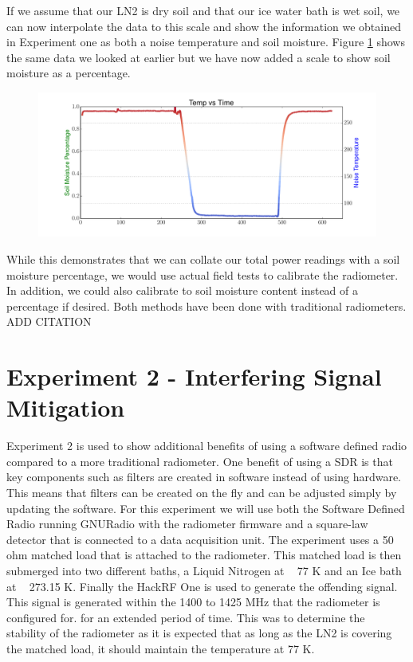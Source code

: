 If we assume that our LN2 is dry soil and that our ice water bath is wet soil, we can now interpolate the data to this scale and show the information we obtained in Experiment one as both a noise temperature and soil moisture.  Figure \ref{SDR_soil} shows the same data we looked at earlier but we have now added a scale to show soil moisture as a percentage.

\begin{figure}[h!tb] \centering

\includegraphics[width=\textwidth]{Experiments/Exp1/sdr_soilmoisture.pdf}
\label{SDR_soil}
\end{figure}

While this demonstrates that we can collate our total power readings with a soil moisture percentage, we would use actual field tests to calibrate the radiometer.  In addition, we could also calibrate to soil moisture content instead of a percentage if desired.  Both methods have been done with traditional radiometers. ADD CITATION

\section{Experiment 2 - Interfering Signal Mitigation}
Experiment 2 is used to show additional benefits of using a software defined radio compared to a more traditional radiometer.  One benefit of using a SDR is that key components such as filters are created in software instead of using hardware.  This means that filters can be created on the fly and can be adjusted simply by updating the software.  For this experiment we will use both the Software Defined Radio running GNURadio with the radiometer firmware and a square-law detector that is connected to a data acquisition unit.  The experiment uses a 50 ohm matched load that is attached to the radiometer.  This matched load is then submerged into two different baths, a Liquid Nitrogen at ~ 77 K and an Ice bath at ~ 273.15 K.  Finally the HackRF One is used to generate the offending signal.  This signal is generated within the 1400 to 1425 MHz that the radiometer is configured for.   for an extended period of time.  This was to determine the stability of the radiometer as it is expected that as long as the LN2 is covering the matched load, it should maintain the temperature at 77 K.  


